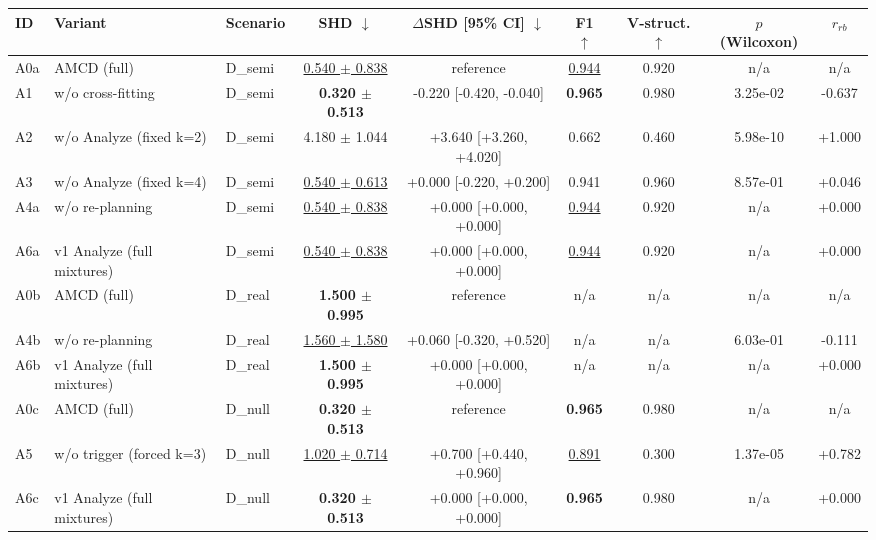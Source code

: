 \begin{tabular}{lllcccccc}
\toprule
ID & Variant & Scenario & SHD $\downarrow$ & $\Delta$SHD [95\% CI] $\downarrow$ & F1 $\uparrow$ & V-struct. $\uparrow$ & $p$ (Wilcoxon) & $r_{rb}$ \\
\midrule
A0a & AMCD (full) & D\_semi & \underline{0.540 $\pm$ 0.838} & reference & \underline{0.944} & 0.920 & n/a & n/a \\
A1 & w/o cross-fitting & D\_semi & \textbf{0.320 $\pm$ 0.513} & -0.220 [-0.420, -0.040] & \textbf{0.965} & 0.980 & 3.25e-02 & -0.637 \\
A2 & w/o Analyze (fixed k=2) & D\_semi & 4.180 $\pm$ 1.044 & +3.640 [+3.260, +4.020] & 0.662 & 0.460 & 5.98e-10 & +1.000 \\
A3 & w/o Analyze (fixed k=4) & D\_semi & \underline{0.540 $\pm$ 0.613} & +0.000 [-0.220, +0.200] & 0.941 & 0.960 & 8.57e-01 & +0.046 \\
A4a & w/o re-planning & D\_semi & \underline{0.540 $\pm$ 0.838} & +0.000 [+0.000, +0.000] & \underline{0.944} & 0.920 & n/a & +0.000 \\
A6a & v1 Analyze (full mixtures) & D\_semi & \underline{0.540 $\pm$ 0.838} & +0.000 [+0.000, +0.000] & \underline{0.944} & 0.920 & n/a & +0.000 \\
A0b & AMCD (full) & D\_real & \textbf{1.500 $\pm$ 0.995} & reference & n/a & n/a & n/a & n/a \\
A4b & w/o re-planning & D\_real & \underline{1.560 $\pm$ 1.580} & +0.060 [-0.320, +0.520] & n/a & n/a & 6.03e-01 & -0.111 \\
A6b & v1 Analyze (full mixtures) & D\_real & \textbf{1.500 $\pm$ 0.995} & +0.000 [+0.000, +0.000] & n/a & n/a & n/a & +0.000 \\
A0c & AMCD (full) & D\_null & \textbf{0.320 $\pm$ 0.513} & reference & \textbf{0.965} & 0.980 & n/a & n/a \\
A5 & w/o trigger (forced k=3) & D\_null & \underline{1.020 $\pm$ 0.714} & +0.700 [+0.440, +0.960] & \underline{0.891} & 0.300 & 1.37e-05 & +0.782 \\
A6c & v1 Analyze (full mixtures) & D\_null & \textbf{0.320 $\pm$ 0.513} & +0.000 [+0.000, +0.000] & \textbf{0.965} & 0.980 & n/a & +0.000 \\
\bottomrule
\end{tabular}
